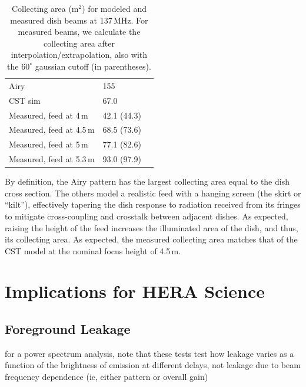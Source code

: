 \documentclass[preprint]{aastex}
\begin{document}
 \begin{table}[h]
 \caption{ \label{table:collectingareatable}Collecting area (m$^2$) for modeled and measured dish beams at 137\,MHz. For measured beams, we calculate the collecting area after interpolation/extrapolation, also with the $60^\circ$ gaussian cutoff (in parentheses).}
\begin{tabular}{| l | l | l |}
\hline
  Airy & 155\,  \\
  CST sim & 67.0\,  \\
  \hline
  Measured, feed at 4\,m & 42.1 (44.3) \\
  Measured, feed at 4.5\,m & 68.5 (73.6) \\ 
  Measured, feed at 5\,m & 77.1 (82.6) \\
  Measured, feed at 5.3\,m & 93.0 (97.9)\\
  \hline
\end{tabular}
\end{table}

By definition, the Airy pattern has the largest collecting area equal to the dish cross section. The others model a realistic feed with a hanging screen (the skirt or ``kilt''), effectively tapering the dish response to radiation received from its fringes to mitigate cross-coupling and crosstalk between adjacent dishes. As expected, raising the height of the feed increases the illuminated area of the dish, and thus, its collecting area. As expected, the measured collecting area matches that of the CST model at the nominal focus height of 4.5\,m.

\section{Implications for HERA Science}
\label{sec:sci}

\subsection{Foreground Leakage}
for a power spectrum analysis, note that these tests test how leakage varies as a function of the brightness of emission at different delays, not leakage due to beam frequency dependence (ie, either pattern or overall gain)
\end{document}
